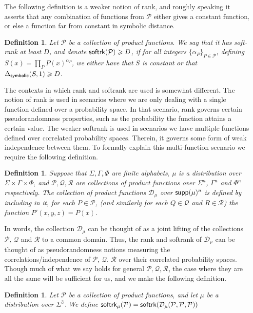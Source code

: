 \documentclass[10pt,a4paper]{amsart}
\newtheorem{definition}[thm]{Definition}
\renewcommand\geq{\geqslant}
\begin{document}
The following definition is a weaker notion of rank, and roughly speaking it asserts that any combination of functions from $\mathcal{P}$ either gives a constant function, or else a function far from constant in symbolic distance.
\begin{definition}\label{def:softrank}
    Let $\mathcal{P}$ be a collection of product functions. We say that it has soft-rank at least $D$, and denote ${\sf softrk}(\mathcal{P})\geq D$, if for all integers $\{\alpha_P\}_{P\in\mathcal{P}}$, defining $S(x) = \prod\limits_{P}P(x)^{\alpha_P}$, we either have that $S$ is constant or that
    $\Delta_{{\sf symbolic}}(S,1)\geq D$.
\end{definition}

The contexts in which rank and softrank are used is somewhat different. The notion of rank is used in scenarios where we are only dealing with a single function defined over a probability space. In that scenario, rank governs certain pseudorandomness properties, such as the probability the function attains a certain value. The weaker softrank is used in scenarios we have multiple functions defined over correlated probability spaces. Therein, it governs some form of weak independence between them. To formally explain this multi-function scenario we require the following definition.
\begin{definition}\label{def:tensor_of_collecitions}
    Suppose that $\Sigma,\Gamma,\Phi$ are finite alphabets, $\mu$ is a distribution over $\Sigma\times\Gamma\times \Phi$, and $\mathcal{P},\mathcal{Q},\mathcal{R}$ are collections of product functions over $\Sigma^n$, $\Gamma^n$ and $\Phi^n$ respectively. The collection of product functions $\mathcal{D}_{\mu}$ over ${\sf supp}(\mu)^n$ is defined by including in it, for each $P\in \mathcal{P}$, 
    (and similarly for each $Q\in \mathcal{Q}$ and $R\in\mathcal{R}$)  
    the function $P'(x,y,z) = P(x)$. 
\end{definition}
In words, the collection $\mathcal{D}_{\mu}$ can be thought of as a joint lifting of the collections $\mathcal{P}$, $\mathcal{Q}$ and $\mathcal{R}$ to a common domain. Thus, the rank and softrank of $\mathcal{D}_{\mu}$ can be thought of as pseudorandomness notions measuring the correlations/independence of $\mathcal{P}$, $\mathcal{Q}$, $\mathcal{R}$ over their correlated probability spaces. Though much of what we say holds for general $\mathcal{P},\mathcal{Q},\mathcal{R}$, the case where they are all the same will be sufficient for us, and we make the following definition.
\begin{definition}
    Let $\mathcal{P}$ be a collection of product functions, and let $\mu$ be a distribution over $\Sigma^3$. We define ${\sf softrk}_{\mu}(\mathcal{P}) = {\sf softrk}(\mathcal{D}_{\mu}(\mathcal{P},\mathcal{P},\mathcal{P}))$
\end{definition}
\end{document}
